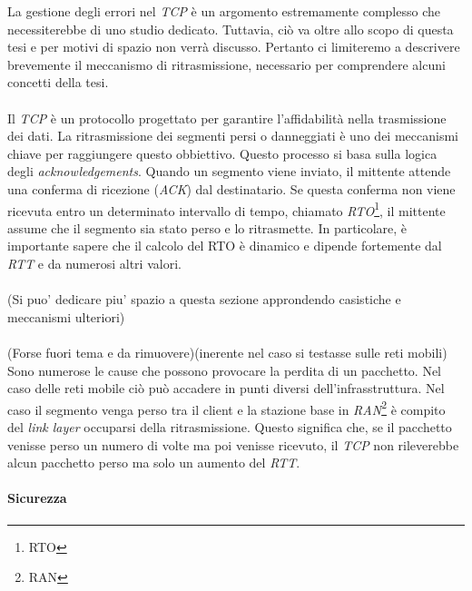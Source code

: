 \noindent La gestione degli errori nel \emph{TCP} è un argomento estremamente complesso che necessiterebbe di uno studio dedicato. 
Tuttavia, ciò va oltre allo scopo di questa tesi e per motivi di spazio non verrà discusso. Pertanto ci limiteremo a descrivere brevemente il meccanismo di ritrasmissione, necessario per comprendere alcuni concetti della tesi.
\\\\
\noindent Il \emph{TCP} è un protocollo progettato per garantire l'affidabilità nella trasmissione dei dati. La ritrasmissione dei segmenti persi o danneggiati è uno dei meccanismi chiave per raggiungere questo obbiettivo. Questo processo si basa sulla logica degli \emph{acknowledgements}. Quando un segmento viene inviato, il mittente attende una conferma di ricezione (\emph{ACK}) dal destinatario. Se questa conferma non viene ricevuta entro un determinato intervallo di tempo, chiamato \emph{RTO}\footnote{\gls{RTO}}, il mittente assume che il segmento sia stato perso e lo ritrasmette.
In particolare, è importante sapere che il calcolo del RTO è dinamico e dipende fortemente dal \emph{RTT} e da numerosi altri valori. 
\\\\
\noindent(Si puo' dedicare piu' spazio a questa sezione approndendo casistiche e meccanismi ulteriori)
\\\\
\noindent(Forse fuori tema e da rimuovere)(inerente nel caso si testasse sulle reti mobili)
\\
Sono numerose le cause che possono provocare la perdita di un pacchetto. Nel caso delle reti mobile ciò può accadere in punti diversi dell'infrasstruttura. Nel caso il segmento venga perso tra il client e la stazione base in \emph{RAN}\footnote{\gls{RAN}} è compito del \emph{link layer} occuparsi della ritrasmissione. Questo significa che, se il pacchetto venisse perso un numero di volte ma poi venisse ricevuto, il \emph{TCP} non rileverebbe alcun pacchetto perso ma solo un aumento del \emph{RTT}.
\paragraph{ Sicurezza }

